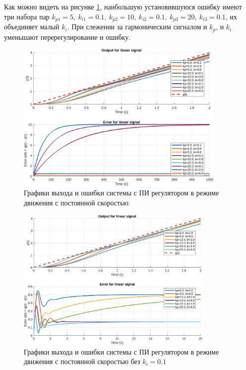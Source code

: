 Как можно видеть на рисунке \ref{fig:task_5_out_linear}, наибольшую установившуюся ошибку
имеют три набора пар $k_{p1}=5,\ k_{i1}=0.1,\ k_{p2}=10,\ k_{i2}=0.1,\ k_{p3}=20,\ k_{i3}=0.1$,
их объединяет малый $k_i$. При слежении за гармоническим сигналом и $k_p$, и $k_i$
уменьшают перерегулирование и ошибку.
\begin{figure}[H]
    \centering
    \includegraphics[width=0.9\textwidth]{figs/task_5_out_linear.png}
    \caption{Графики выхода и ошибки системы с ПИ регулятором в режиме движения с постоянной скоростью}
    \label{fig:task_5_out_linear}
\end{figure}
\begin{figure}[H]
    \centering
    \includegraphics[width=0.85\textwidth]{figs/task_5_out_1_linear.png}
    \caption{Графики выхода и ошибки системы с ПИ регулятором в режиме движения с постоянной скоростью без $k_i=0.1$}
    \label{fig:task_5_out_1_linear}
\end{figure}
